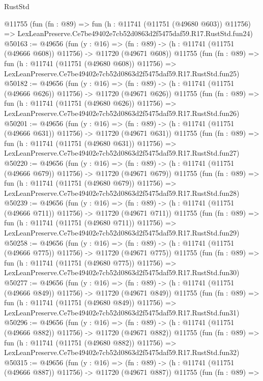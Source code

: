 \begin{lexlean}{RustStd}
\begin{coremodule}
    @11755
    (fun (fn : @89) =>
    fun (h : @11741 (@11751 (@49680 @603)) @11756) =>
    LexLeanPreserve.Ce7be49402e7cb52d0863d2f5475daf59.R17.RustStd.fun24)
@50163 := @49656
    (fun (y : @16) =>
    (fn : @89) -> (h : @11741 (@11751 (@49666 @608)) @11756) -> @11720 (@49671 @608))
    @11755
    (fun (fn : @89) =>
    fun (h : @11741 (@11751 (@49680 @608)) @11756) =>
    LexLeanPreserve.Ce7be49402e7cb52d0863d2f5475daf59.R17.RustStd.fun25)
@50182 := @49656
    (fun (y : @16) =>
    (fn : @89) -> (h : @11741 (@11751 (@49666 @626)) @11756) -> @11720 (@49671 @626))
    @11755
    (fun (fn : @89) =>
    fun (h : @11741 (@11751 (@49680 @626)) @11756) =>
    LexLeanPreserve.Ce7be49402e7cb52d0863d2f5475daf59.R17.RustStd.fun26)
@50201 := @49656
    (fun (y : @16) =>
    (fn : @89) -> (h : @11741 (@11751 (@49666 @631)) @11756) -> @11720 (@49671 @631))
    @11755
    (fun (fn : @89) =>
    fun (h : @11741 (@11751 (@49680 @631)) @11756) =>
    LexLeanPreserve.Ce7be49402e7cb52d0863d2f5475daf59.R17.RustStd.fun27)
@50220 := @49656
    (fun (y : @16) =>
    (fn : @89) -> (h : @11741 (@11751 (@49666 @679)) @11756) -> @11720 (@49671 @679))
    @11755
    (fun (fn : @89) =>
    fun (h : @11741 (@11751 (@49680 @679)) @11756) =>
    LexLeanPreserve.Ce7be49402e7cb52d0863d2f5475daf59.R17.RustStd.fun28)
@50239 := @49656
    (fun (y : @16) =>
    (fn : @89) -> (h : @11741 (@11751 (@49666 @711)) @11756) -> @11720 (@49671 @711))
    @11755
    (fun (fn : @89) =>
    fun (h : @11741 (@11751 (@49680 @711)) @11756) =>
    LexLeanPreserve.Ce7be49402e7cb52d0863d2f5475daf59.R17.RustStd.fun29)
@50258 := @49656
    (fun (y : @16) =>
    (fn : @89) -> (h : @11741 (@11751 (@49666 @775)) @11756) -> @11720 (@49671 @775))
    @11755
    (fun (fn : @89) =>
    fun (h : @11741 (@11751 (@49680 @775)) @11756) =>
    LexLeanPreserve.Ce7be49402e7cb52d0863d2f5475daf59.R17.RustStd.fun30)
@50277 := @49656
    (fun (y : @16) =>
    (fn : @89) -> (h : @11741 (@11751 (@49666 @849)) @11756) -> @11720 (@49671 @849))
    @11755
    (fun (fn : @89) =>
    fun (h : @11741 (@11751 (@49680 @849)) @11756) =>
    LexLeanPreserve.Ce7be49402e7cb52d0863d2f5475daf59.R17.RustStd.fun31)
@50296 := @49656
    (fun (y : @16) =>
    (fn : @89) -> (h : @11741 (@11751 (@49666 @882)) @11756) -> @11720 (@49671 @882))
    @11755
    (fun (fn : @89) =>
    fun (h : @11741 (@11751 (@49680 @882)) @11756) =>
    LexLeanPreserve.Ce7be49402e7cb52d0863d2f5475daf59.R17.RustStd.fun32)
@50315 := @49656
    (fun (y : @16) =>
    (fn : @89) -> (h : @11741 (@11751 (@49666 @887)) @11756) -> @11720 (@49671 @887))
    @11755
    (fun (fn : @89) =>

\end{coremodule}
\end{lexlean}
